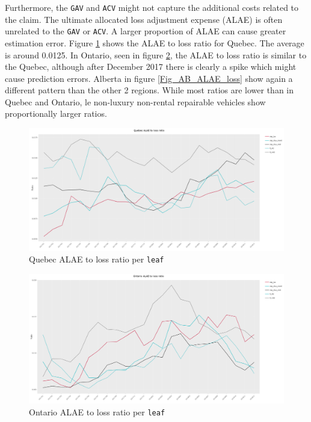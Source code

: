 	Furthermore, the \texttt{GAV} and \texttt{ACV} might not capture the additional costs related to the claim. The ultimate allocated loss adjustment expense (ALAE) is often unrelated to the \texttt{GAV} or \texttt{ACV}. A larger proportion of ALAE can cause greater estimation error. Figure \ref{Fig_QC_ALAE_loss} shows the ALAE to loss ratio for Quebec. The average is around 0.0125. In Ontario, seen in figure \ref{Fig_ON_ALAE_loss}, the ALAE to loss ratio is similar to the Quebec, although after December 2017 there is clearly a spike which might cause prediction errors. Alberta in figure \ref{Fig_AB_ALAE_loss} show again a different pattern than the other 2 regions. While most ratios are lower than in Quebec and Ontario, le non-luxury  non-rental repairable vehicles show proportionally larger ratios. 
	
	\begin{figure}[H]
		\begin{center}
			\includegraphics[scale=0.2]{Graphiques/QC_ALAE_loss} 
			\renewcommand{\figurename}{Figure}
			\caption{Quebec ALAE to loss ratio per \texttt{leaf}}\label{Fig_QC_ALAE_loss}
		\end{center}
	\end{figure}

	\begin{figure}[H]
		\begin{center}
				\includegraphics[scale=0.2]{Graphiques/ON_ALAE_loss} 
			\renewcommand{\figurename}{Figure}
			\caption{Ontario ALAE to loss ratio per \texttt{leaf}}\label{Fig_ON_ALAE_loss}
		\end{center}
	\end{figure}
	

